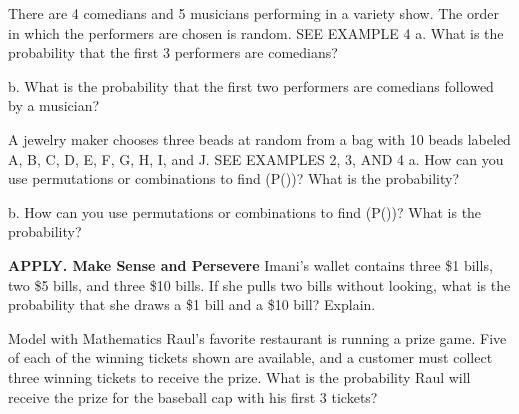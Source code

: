 \documentclass{article}
\newenvironment{practice}[2]{}{}        %
\newcommand{\answer}[1]{}               %
\newcommand{\placeholder}[2]{}          %
\newcommand{\te}[1]{}                   %
\begin{document}
\begin{practice}{28}{2}
There are 4 comedians and 5 musicians performing in a variety show. The order in which the performers are chosen is random. SEE EXAMPLE 4
a. What is the probability that the first 3 performers are comedians?
\answer{a. (\frac{{}_4P_3\cdot{}_5P_0}{{}_9P_3}=\frac{24}{504}=\frac1{21})}
b. What is the probability that the first two performers are comedians followed by a musician?
\answer{b. (\frac{{}_4P_2\cdot{}_5P_1}{{}_9P_3}=\frac{60}{504}=\frac5{42})}
\te{Answers printed on next page.}
\end{practice}
\begin{practice}{29}{2}
A jewelry maker chooses three beads at random from a bag with 10 beads labeled A, B, C, D, E, F, G, H, I, and J. SEE EXAMPLES 2, 3, AND 4
a. How can you use permutations or combinations to find (P())? What is the probability?
\answer{a. Use a permutation because order matters. (P(DEB)=\frac1{{}_{10}P_3}=\frac1{720})}
b. How can you use permutations or combinations to find (P())? What is the probability?
\answer{b. Use combinations because order does not matter. (P(\text{all vowels})=\frac{{}_3C_3}{{}_{10}C_3}=\frac1{120})}
\te{Answers printed on next page.}
\end{practice}
\begin{practice}{30}{3}
\textbf{APPLY. Make Sense and Persevere} Imani's wallet contains three \$1 bills, two \$5 bills, and three \$10 bills. If she pulls two bills without looking, what is the probability that she draws a \$1 bill and a \$10 bill? Explain.
\answer{(\frac9{28}); use combinations because which \$1 bill and which \$10 bill do not matter, and the order in which they are pulled out does not matter. (\frac{{}_3C_1\cdot{}_3C_1}{{}_8C_2}=\frac9{28})}
\end{practice}
\begin{practice}{31}{2}
Model with Mathematics Raul's favorite restaurant is running a prize game. Five of each of the winning tickets shown are available, and a customer must collect three winning tickets to receive the prize. What is the probability Raul will receive the prize for the baseball cap with his first 3 tickets?
\placeholder{illustration}{Four tickets each headed WIN A...: green with baseball cap, orange with yellow bottle, pink with music player and earbuds, pale blue with key ring.}
\answer{(\frac1{114}); there are ({}_5C_3) ways to select the tickets he wants and ({}_{20}C_3) ways to select 3 tickets. So (P(3\text{ winning baseball cap tickets})=\frac{{}_5C_3}{{}_{20}C_3}=\frac{10}{1,140}=\frac1{114}).}
\end{practice}
\end{document}
